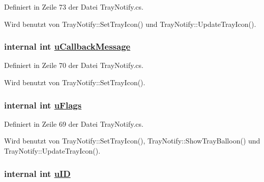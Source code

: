 Definiert in Zeile 73 der Datei Tray\-Notify.cs.

Wird benutzt von Tray\-Notify::Set\-Tray\-Icon() und Tray\-Notify::Update\-Tray\-Icon().\hypertarget{structQbeTray_1_1TrayNotify_1_1NOTIFYICONDATA_QbeTray_1_1TrayNotify_1_1NOTIFYICONDATAo4}{
\subsubsection[uCallbackMessage]{\setlength{\rightskip}{0pt plus 5cm}internal int \hyperlink{structQbeTray_1_1TrayNotify_1_1NOTIFYICONDATA_QbeTray_1_1TrayNotify_1_1NOTIFYICONDATAo4}{u\-Callback\-Message}}}
\label{structQbeTray_1_1TrayNotify_1_1NOTIFYICONDATA_QbeTray_1_1TrayNotify_1_1NOTIFYICONDATAo4}




Definiert in Zeile 70 der Datei Tray\-Notify.cs.

Wird benutzt von Tray\-Notify::Set\-Tray\-Icon().\hypertarget{structQbeTray_1_1TrayNotify_1_1NOTIFYICONDATA_QbeTray_1_1TrayNotify_1_1NOTIFYICONDATAo3}{
\subsubsection[uFlags]{\setlength{\rightskip}{0pt plus 5cm}internal int \hyperlink{structQbeTray_1_1TrayNotify_1_1NOTIFYICONDATA_QbeTray_1_1TrayNotify_1_1NOTIFYICONDATAo3}{u\-Flags}}}
\label{structQbeTray_1_1TrayNotify_1_1NOTIFYICONDATA_QbeTray_1_1TrayNotify_1_1NOTIFYICONDATAo3}




Definiert in Zeile 69 der Datei Tray\-Notify.cs.

Wird benutzt von Tray\-Notify::Set\-Tray\-Icon(), Tray\-Notify::Show\-Tray\-Balloon() und Tray\-Notify::Update\-Tray\-Icon().\hypertarget{structQbeTray_1_1TrayNotify_1_1NOTIFYICONDATA_QbeTray_1_1TrayNotify_1_1NOTIFYICONDATAo2}{
\subsubsection[uID]{\setlength{\rightskip}{0pt plus 5cm}internal int \hyperlink{structQbeTray_1_1TrayNotify_1_1NOTIFYICONDATA_QbeTray_1_1TrayNotify_1_1NOTIFYICONDATAo2}{u\-ID}}}
\label{structQbeTray_1_1TrayNotify_1_1NOTIFYICONDATA_QbeTray_1_1TrayNotify_1_1NOTIFYICONDATAo2}




